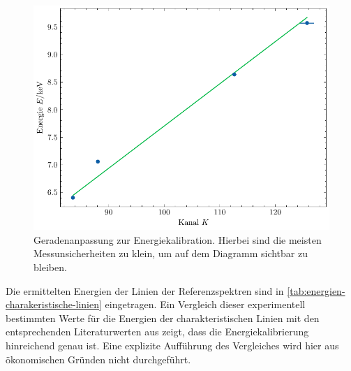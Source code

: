 \begin{figure}[H]
	\centering
	\includegraphics[width=0.6\linewidth]{../figs/kallibrationskurve.pdf}
	\caption{Geradenanpassung zur Energiekalibration. Hierbei sind die meisten Messunsicherheiten zu klein, um auf dem Diagramm 
        sichtbar zu bleiben.}
	\label{fig:kalibrationskurve}
\end{figure} Die ermittelten Energien der Linien der Referenzspektren sind in \cref{tab:energien-charakeristische-linien} eingetragen. Ein Vergleich
dieser experimentell bestimmten Werte für die Energien der charakteristischen Linien mit den entsprechenden Literaturwerten aus \cite{xraydata} zeigt,
dass die Energiekalibrierung hinreichend genau ist. Eine explizite Aufführung des Vergleiches wird hier aus ökonomischen Gründen nicht durchgeführt.

\newpage

